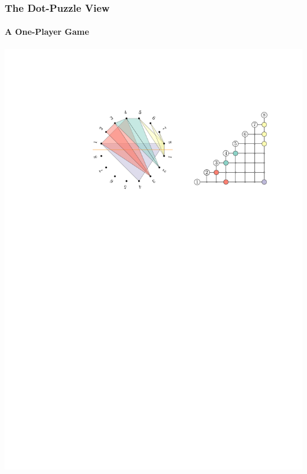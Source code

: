 \documentclass{beamer}
\begin{document}
\begin{frame}
    \frametitle{The Dot-Puzzle View}
    \framesubtitle{A One-Player Game}

    \includegraphics[width=.95\textwidth]{figs/point-view}
\end{frame}
\end{document}
